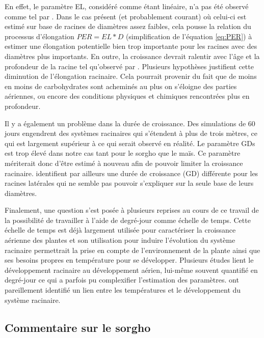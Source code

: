 En effet, le paramètre EL, considéré comme étant linéaire, n'a pas été observé comme tel par \cite{pellerinand_evaluation_1994}.
Dans le cas présent (et probablement courant) où celui-ci est estimé sur base de racines de diamètres assez faibles, cela pousse la relation du processus d'élongation $PER = EL*D$ (simplification de l'équation \ref{eq:PER}) à estimer une élongation potentielle bien trop importante pour les racines avec des diamètres plus importants.
En outre, la croissance devrait ralentir avec l'âge et la profondeur de la racine tel qu'observé par \cite{pellerinand_evaluation_1994}.
Plusieurs hypothèses justifient cette diminution de l'élongation racinaire.
Cela pourrait provenir du fait que de moins en moins de carbohydrates sont acheminés au plus on s'éloigne des parties aériennes, ou encore des conditions physiques et chimiques rencontrées plus en profondeur.
\newline

Il y a également un problème dans la durée de croissance.
Des simulations de 60 jours engendrent des systèmes racinaires qui s'étendent à plus de trois mètres, ce qui est largement supérieur à ce qui serait observé en réalité.
Le paramètre GDs est trop élevé dans notre cas tant pour le sorgho que le maïs.
Ce paramètre mériterait donc d'être estimé à nouveau afin de pouvoir limiter la croissance racinaire.
\cite{cahn_relationship_1989} identifient par ailleurs une durée de croissance (GD) différente pour les racines latérales qui ne semble pas pouvoir s'expliquer sur la seule base de leurs diamètres.
\newline

Finalement, une question s'est posée à plusieurs reprises au cours de ce travail de la possibilité de travailler à l'aide de degré-jour comme échelle de temps.
Cette échelle de temps est déjà largement utilisée pour caractériser la croissance aérienne des plantes et son utilisation pour induire l'évolution du système racinaire permettrait la prise en compte de l'environnement de la plante ainsi que ses besoins propres en température pour se développer.
Plusieurs études lient le développement racinaire au développement aérien, lui-même souvent quantifié en degré-jour ce qui a parfois pu complexifier l'estimation des paramètres.
\cite{pellerinand_evaluation_1994} ont pareillement identifié un lien entre les températures et le développement du système racinaire.

\subsection{Commentaire sur le sorgho}

